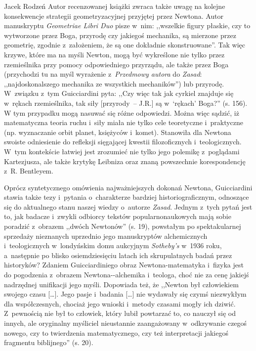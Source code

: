 \begin{recplenv}{Jacek Rodzeń}
Autor recenzowanej książki zwraca także uwagę na kolejne konsekwencje strategii geometryzacyjnej przyjętej przez
Newtona. Autor manuskryptu \textit{Geometriae Libri Duo} pisze w~nim: ,,wszelkie figury płaskie, czy to wytworzone przez
Boga, przyrodę czy jakiegoś mechanika, są mierzone przez geometrię, zgodnie z~założeniem, że są one dokładnie
skonstruowane''. Tak więc krzywe, które ma na myśli Newton, mogą być wykreślone nie tylko przez rzemieślnika przy pomocy
odpowiedniego przyrządu, ale także przez Boga (przychodzi tu na myśl wyrażenie z~\textit{Przedmowy autora} do
\textit{Zasad}: ,,najdoskonalszego mechanika ze wszystkich mechaników'') lub przyrodę. W~związku z~tym Guicciardini pyta:
,,Czy więc tak jak cyrkiel znajduje się w~rękach rzemieślnika, tak siły [przyrody~-- J.R.] są w~‘rękach’ Boga?'' (s. 156).
W tym przypadku mogą nasuwać się różne odpowiedzi. Można więc sądzić, iż matematyczna teoria ruchu i~siły miała nie
tylko cele teoretyczne i~praktyczne (np. wyznaczanie orbit planet, księżyców i~komet). Stanowiła dla Newtona swoiste
odniesienie do refleksji sięgającej kwestii filozoficznych i~teologicznych. W~tym kontekście łatwiej jest zrozumieć nie
tylko jego polemikę z~poglądami Kartezjusza, ale także krytykę Leibniza oraz znaną powszechnie
korespondencję z~R. Bentleyem.

Oprócz syntetycznego omówienia najważniejszych dokonań Newtona, Guicciardini stawia także
tezy i~pytania o~charakterze bardziej historiograficznym, odnoszące się do aktualnego stanu naszej
wiedzy o~autorze \textit{Zasad}.
Jednym z~tych pytań jest to, jak badacze i~zwykli odbiorcy tekstów popularnonaukowych mają sobie poradzić z~obrazem
,,dwóch Newtonów'' (s. 19), powstałym po spektakularnej sprzedaży nieznanych uprzednio jego manuskryptów
alchemicznych i~teologicznych w~londyńskim domu aukcyjnym \textit{Sotheby’s} w~1936 roku, a~następnie
po blisko osiemdziesięciu latach
ich skrupulatnych badań przez historyków? Zdaniem Guicciardiniego obraz Newtona-matematyka i~fizyka jest do
pogodzenia z~obrazem
Newtona-\mbox{-alchemika} %
i~teologa, choć nie za cenę jakiejś nadrzędnej unifikacji jego myśli.
Dopowiada też, że
,,Newton był człowiekiem swojego czasu […]. Jego pasje i~badania […] nie wydawały się czymś niezwykłym dla
współczesnych, chociaż jego wnioski i~metody czasami mogły ich dziwić. Z~pewnością nie był to człowiek, który lubił
powtarzać to, co nauczył się od innych, ale oryginalny myśliciel nieustannie zaangażowany w~odkrywanie czegoś nowego,
czy to twierdzenia matematycznego, czy też interpretacji jakiegoś fragmentu biblijnego'' (s. 20). 


\end{recplenv}
